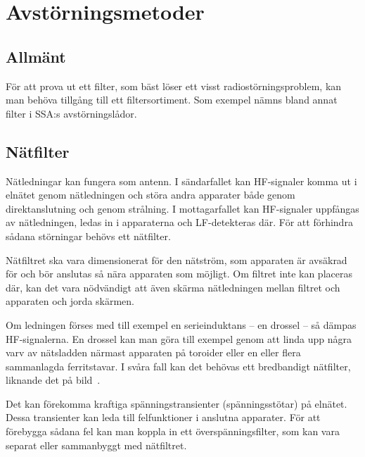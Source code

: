 \section{Avstörningsmetoder}
\label{sec:avstoerning}


\subsection{Allmänt}
För att prova ut ett filter, som bäst löser ett visst radiostörningsproblem,
kan man behöva tillgång till ett filtersortiment.
Som exempel nämns bland annat filter i SSA:s avstörningslådor.

\subsection{Nätfilter}

Nätledningar kan fungera som antenn.
I sändarfallet kan HF-signaler komma ut i elnätet genom nätledningen och störa
andra apparater både genom direktanslutning och genom strålning.
I mottagarfallet kan HF-signaler uppfångas av nätledningen, ledas in i
apparaterna och LF-detekteras där.
För att förhindra sådana störningar behövs ett nätfilter.

Nätfiltret ska vara dimensionerat för den nätström, som apparaten är avsäkrad
för och bör anslutas så nära apparaten som möjligt.
Om filtret inte kan placeras där, kan det vara nödvändigt att även skärma
nätledningen mellan filtret och apparaten och jorda skärmen.

Om ledningen förses med till exempel en serieinduktans -- en drossel -- så
dämpas HF-signalerna.
En drossel kan man göra till exempel genom att linda
upp några varv av nätsladden
närmast apparaten på toroider eller en eller flera sammanlagda ferritstavar.
I svåra fall kan det behövas ett bredbandigt nätfilter, liknande
det på bild~.

Det kan förekomma kraftiga spänningstransienter (spänningsstötar) på elnätet.
Dessa transienter kan leda till felfunktioner i anslutna apparater.
För att förebygga sådana fel kan man koppla in ett överspänningsfilter, som kan
vara separat eller sammanbyggt med nätfiltret.

